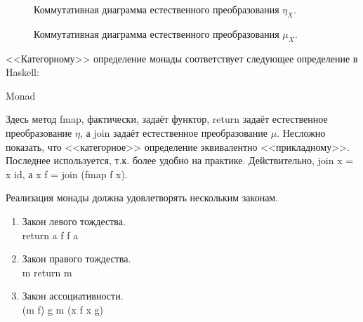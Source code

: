 \begin{figure}[h]
  \centering
    \caption{Коммутативная диаграмма естественного преобразования $\eta_X$.}
    \label{cd:monad-1}
\end{figure}

\begin{figure}[h]
  \centering
    \caption{Коммутативная диаграмма естественного преобразования $\mu_X$.}
    \label{cd:monad-assoc}
\end{figure}

<<Категорному>> определение монады соответствует следующее определение в Haskell:
\begin{haskell}
 Monad \mu {} \\
\quad{}
\end{haskell}

Здесь метод \<fmap\>, фактически, задаёт функтор, \<return\> задаёт естественное преобразование $\eta$, а \<join\> задаёт естественное преобразование $\mu$. Несложно показать, что <<категорное>> определение эквивалентно <<прикладному>>. Последнее используется, т.к. более удобно на практике. Действительно, \<join x = x \hsbind id\>, а \<x \hsbind f = join (fmap f x)\>.

Реализация монады должна удовлетворять нескольким законам.
\begin{enumerate}
  \item Закон левого тождества. \\ \<return a \hsbind f \equiv f a\>
  \item Закон правого тождества. \\ \<m \hsbind return \equiv m\>
  \item Закон ассоциативности. \\ \<(m \hsbind f) \hsbind g \equiv m \hsbind (\lambda x \to f x \hsbind g)\>
\end{enumerate}

